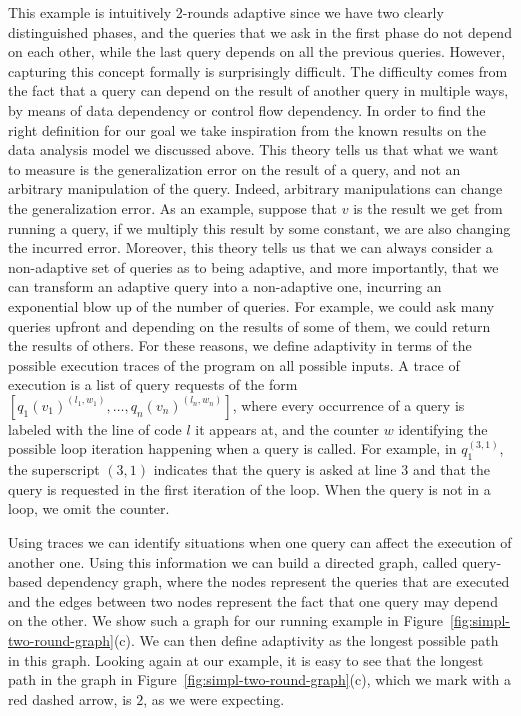 This example is intuitively 2-rounds adaptive since we have two clearly distinguished phases, and the queries that we ask in the first phase do not depend on each other, while the last query depends on all the previous queries. 
However, capturing this concept formally is surprisingly difficult. The difficulty comes from the fact that a query can depend on the result of another query in multiple ways, by means of data dependency or control flow dependency. In order to find the right definition for our goal we take inspiration from the known results on the data analysis model we discussed above. This theory tells us that what we want to measure is the generalization error on the result of a query, and not an arbitrary manipulation of the query. Indeed, arbitrary manipulations can change the generalization error. As an example, suppose that $v$ is the result we get from running a query, if we multiply this result by some constant, we are also changing the incurred error. Moreover, this theory tells us that we can always consider a non-adaptive set of queries as to being adaptive, and more importantly, that we can transform an adaptive query into a non-adaptive one, incurring an exponential blow up of the number of queries. For example, we could ask many queries upfront and depending on the results of some of them, we could return the results of others. For these reasons, we define adaptivity in terms of the possible execution traces of the program on all possible inputs. A trace of execution is a list of query requests of the form $[q_1(v_1)^{(l_1,w_1)},\ldots, q_n(v_n)^{(l_n,w_n)}]$, where every occurrence of a query is labeled with the line of code $l$ it appears at, and the counter $w$ identifying the possible loop iteration happening when a query is called. For example, in $q_1^{(3,1)}$, the superscript $(3,1)$ indicates that the query is asked at line $3$ and that the query is requested in the first iteration of the loop. When the query is not in a loop, we omit the counter.

Using traces we can identify situations when one query can affect the execution of another one. Using this information we can build a directed graph, called query-based dependency graph, where the nodes represent the queries that are executed and the edges between two nodes represent the fact that one query may depend on the other. We show such a graph for our running example in Figure~\ref{fig:simpl-two-round-graph}(c). We can then define adaptivity as the longest possible path in this graph.  Looking again at our example, it is easy to see that the longest path in the graph in Figure~\ref{fig:simpl-two-round-graph}(c), which we mark with a red dashed arrow, is $2$, as we were expecting.

